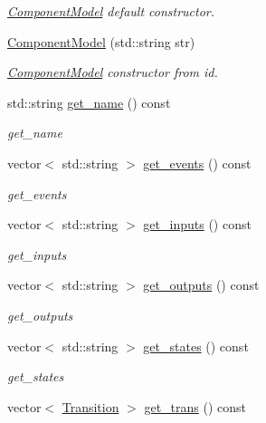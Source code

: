 \begin{DoxyCompactItemize}
\begin{DoxyCompactList}\small\item\em \hyperlink{class_component_model}{Component\+Model} default constructor. \end{DoxyCompactList}\item 
\hyperlink{class_component_model_a4a2b81f18a4109a2510da0441bd6dd92}{Component\+Model} (std\+::string str)
\begin{DoxyCompactList}\small\item\em \hyperlink{class_component_model}{Component\+Model} constructor from id. \end{DoxyCompactList}\item 
std\+::string \hyperlink{class_component_model_a8827d16c2751dc3ec2e876bd219c81f4}{get\+\_\+name} () const 
\begin{DoxyCompactList}\small\item\em get\+\_\+name \end{DoxyCompactList}\item 
vector$<$ std\+::string $>$ \hyperlink{class_component_model_a0e405f2d7095cb12c48994a7028e5a49}{get\+\_\+events} () const 
\begin{DoxyCompactList}\small\item\em get\+\_\+events \end{DoxyCompactList}\item 
vector$<$ std\+::string $>$ \hyperlink{class_component_model_a59727fd988b5adddd5e769500720c99a}{get\+\_\+inputs} () const 
\begin{DoxyCompactList}\small\item\em get\+\_\+inputs \end{DoxyCompactList}\item 
vector$<$ std\+::string $>$ \hyperlink{class_component_model_afbdb01b399354b308d61ae1393cbec63}{get\+\_\+outputs} () const 
\begin{DoxyCompactList}\small\item\em get\+\_\+outputs \end{DoxyCompactList}\item 
vector$<$ std\+::string $>$ \hyperlink{class_component_model_a7960473e775b4dbbc0ddcc0c89bc2d20}{get\+\_\+states} () const 
\begin{DoxyCompactList}\small\item\em get\+\_\+states \end{DoxyCompactList}\item 
vector$<$ \hyperlink{class_transition}{Transition} $>$ \hyperlink{class_component_model_ad35b6b75698b8eeeee0e59b994e6292a}{get\+\_\+trans} () const 

\end{DoxyCompactItemize}
